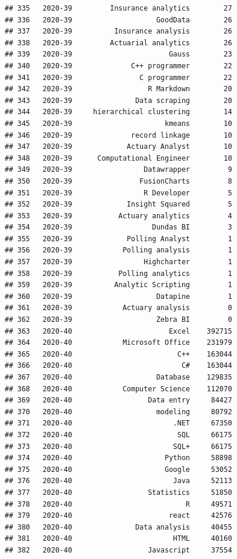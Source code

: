 \documentclass[
]{article}
\begin{document}
\begin{verbatim}
## 335   2020-39         Insurance analytics        27
## 336   2020-39                    GoodData        26
## 337   2020-39          Insurance analysis        26
## 338   2020-39         Actuarial analytics        26
## 339   2020-39                       Gauss        23
## 340   2020-39              C++ programmer        22
## 341   2020-39                C programmer        22
## 342   2020-39                  R Markdown        20
## 343   2020-39               Data scraping        20
## 344   2020-39     hierarchical clustering        14
## 345   2020-39                      kmeans        10
## 346   2020-39              record linkage        10
## 347   2020-39             Actuary Analyst        10
## 348   2020-39      Computational Engineer        10
## 349   2020-39                 Datawrapper         9
## 350   2020-39                FusionCharts         8
## 351   2020-39                 R Developer         5
## 352   2020-39             Insight Squared         5
## 353   2020-39           Actuary analytics         4
## 354   2020-39                   Dundas BI         3
## 355   2020-39             Polling Analyst         1
## 356   2020-39            Polling analysis         1
## 357   2020-39                 Highcharter         1
## 358   2020-39           Polling analytics         1
## 359   2020-39          Analytic Scripting         1
## 360   2020-39                    Datapine         1
## 361   2020-39            Actuary analysis         0
## 362   2020-39                    Zebra BI         0
## 363   2020-40                       Excel    392715
## 364   2020-40            Microsoft Office    231979
## 365   2020-40                         C++    163044
## 366   2020-40                          C#    163044
## 367   2020-40                    Database    129835
## 368   2020-40            Computer Science    112070
## 369   2020-40                  Data entry     84427
## 370   2020-40                    modeling     80792
## 371   2020-40                        .NET     67350
## 372   2020-40                         SQL     66175
## 373   2020-40                        SQL+     66175
## 374   2020-40                      Python     58898
## 375   2020-40                      Google     53052
## 376   2020-40                        Java     52113
## 377   2020-40                  Statistics     51850
## 378   2020-40                           R     49571
## 379   2020-40                       react     42576
## 380   2020-40               Data analysis     40455
## 381   2020-40                        HTML     40160
## 382   2020-40                  Javascript     37554

\end{verbatim}
\end{document}
